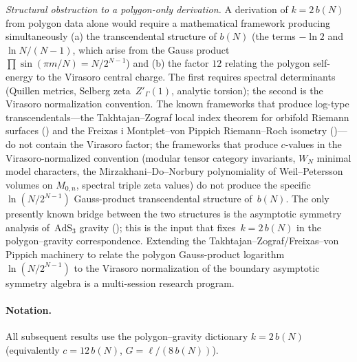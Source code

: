 \begin{remark}[Status of the identification $k = 2\,b(N)$]
\emph{Structural obstruction to a polygon-only derivation.}
A derivation of $k = 2\,b(N)$ from polygon data alone
would require a mathematical framework producing
simultaneously (a) the transcendental structure of
$b(N)$ (the terms $-\ln 2$ and $\ln N/(N{-}1)$, which
arise from the Gauss product
$\prod\sin(\pi m/N) = N/2^{N{-}1}$) and (b) the factor
$12$ relating the polygon self-energy to the Virasoro
central charge. The first requires spectral determinants
(Quillen metrics, Selberg zeta~$Z'_\Gamma(1)$,
analytic torsion); the second is the Virasoro
normalization convention. The known frameworks that
produce log-type transcendentals---the
Takhtajan--Zograf local index theorem for orbifold
Riemann surfaces (\citealt{TakhtajanZograf2018})
and the Freixas i Montplet--von Pippich Riemann--Roch
isometry (\citealt{FreixasVonPippich2020})---do not
contain the Virasoro factor; the frameworks that
produce $c$-values in the Virasoro-normalized convention
(modular tensor category invariants, $W_N$ minimal
model characters, the Mirzakhani--Do--Norbury
polynomiality of Weil--Petersson volumes on $M_{0,n}$,
spectral triple zeta values) do not produce the specific
$\ln(N/2^{N{-}1})$ Gauss-product transcendental structure
of~$b(N)$. The only presently known bridge between the
two structures is the asymptotic symmetry analysis
of~$\mathrm{AdS}_3$ gravity
(\citealt{BrownHenneaux1986}); this is the input that
fixes~$k = 2\,b(N)$ in the polygon--gravity correspondence.
Extending the Takhtajan--Zograf/Freixas--von Pippich
machinery to relate the polygon Gauss-product logarithm
$\ln(N/2^{N{-}1})$ to the Virasoro normalization of the
boundary asymptotic symmetry algebra is a multi-session
research program.
\end{remark}


\paragraph{Notation.}
All subsequent results use the polygon--gravity
dictionary $k = 2\,b(N)$ (equivalently $c = 12\,b(N)$,
$G = \ell/(8\,b(N))$).

